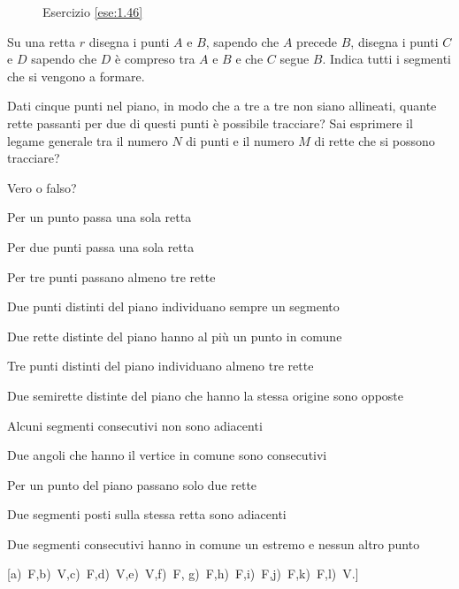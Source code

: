 \begin{inaccessibleblock}
 \begin{figure}[htb]
 \centering
 \caption{Esercizio \ref{ese:1.46}}\label{fig:ese1.46}
\end{figure}
\end{inaccessibleblock}

\begin{esercizio}
\label{ese:1.47}
Su una retta $r$ disegna i punti $A$ e $B$, sapendo che $A$ precede 
$B$, disegna i punti $C$ e $D$ sapendo che $D$ è compreso tra $A$ e 
$B$ e che $C$ segue $B$. Indica tutti i segmenti che si vengono a 
formare.
\end{esercizio}

\begin{esercizio}
\label{ese:1.48}
Dati cinque punti nel piano, in modo che a tre a tre non siano 
allineati, quante rette passanti per due di questi punti è possibile 
tracciare? Sai esprimere il legame generale tra il numero $N$ di 
punti e il numero $M$ di rette che si possono tracciare?
\end{esercizio}

\begin{esercizio}
\label{ese:1.49}
Vero o falso?
\vspace{-.5em}
\begin{enumeratea}
\item Per un punto passa una sola retta \hfill\boxV\quad\boxF
\item Per due punti passa una sola retta \hfill\boxV\quad\boxF
\item Per tre punti passano almeno tre rette \hfill\boxV\quad\boxF
\item Due punti distinti del piano individuano sempre un segmento
\hfill\boxV\quad\boxF
\item Due rette distinte del piano hanno al più un punto in comune 
\hfill\boxV\quad\boxF
\item Tre punti distinti del piano individuano almeno tre rette
\hfill\boxV\quad\boxF
\item Due semirette distinte del piano che hanno la stessa origine 
sono opposte \hfill\boxV\quad\boxF
\item Alcuni segmenti consecutivi non sono adiacenti
\hfill\boxV\quad\boxF
\item Due angoli che hanno il vertice in comune sono consecutivi 
\hfill\boxV\quad\boxF
\item Per un punto del piano passano solo due rette
\hfill\boxV\quad\boxF
\item Due segmenti posti sulla stessa retta sono adiacenti
\hfill\boxV\quad\boxF
\item Due segmenti consecutivi hanno in comune un estremo e nessun altro punto 
\hfill\boxV\quad\boxF
\end{enumeratea}
 \hfill[a)~F,\quad b)~V,\quad c)~F,\quad d)~V,\quad e)~V,\quad f)~F,\quad 
g)~F,\quad h)~F,\quad i)~F,\quad j)~F,\quad k)~F,\quad l)~V.]
\end{esercizio}

